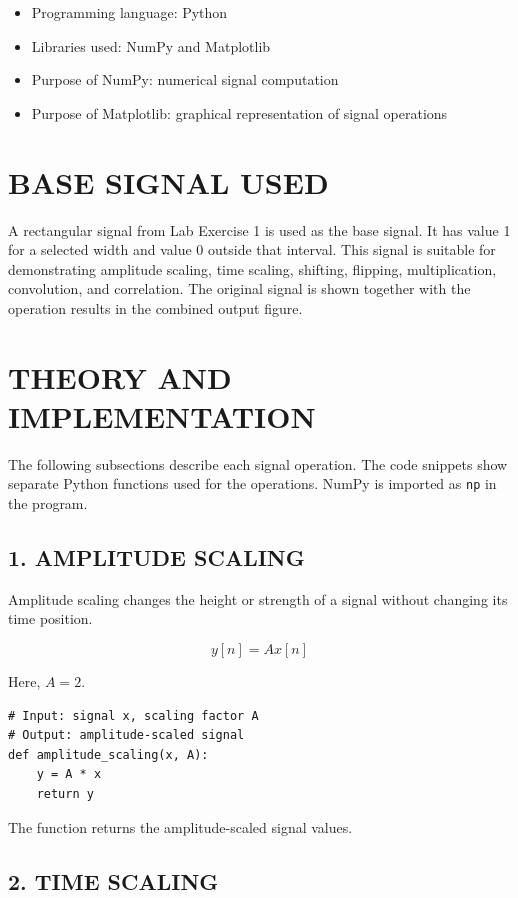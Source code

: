 \documentclass[12pt,a4paper]{article}
\begin{document}
\begin{itemize}
    \item Programming language: Python
    \item Libraries used: NumPy and Matplotlib
    \item Purpose of NumPy: numerical signal computation
    \item Purpose of Matplotlib: graphical representation of signal operations
\end{itemize}

\section*{BASE SIGNAL USED}

A rectangular signal from Lab Exercise 1 is used as the base signal. It has value 1 for a selected width and value 0 outside that interval. This signal is suitable for demonstrating amplitude scaling, time scaling, shifting, flipping, multiplication, convolution, and correlation. The original signal is shown together with the operation results in the combined output figure.

\section*{THEORY AND IMPLEMENTATION}

The following subsections describe each signal operation. The code snippets show separate Python functions used for the operations. NumPy is imported as \texttt{np} in the program.

\subsection*{1. AMPLITUDE SCALING}

Amplitude scaling changes the height or strength of a signal without changing its time position.

\[
y[n] = A x[n]
\]


Here, \(A = 2\).

\begin{lstlisting}[style=pythoncode]
# Input: signal x, scaling factor A
# Output: amplitude-scaled signal
def amplitude_scaling(x, A):
    y = A * x
    return y
\end{lstlisting}

The function returns the amplitude-scaled signal values.

\subsection*{2. TIME SCALING}
\end{document}
